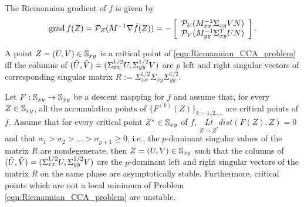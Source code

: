 \documentclass[11pt,a4paper]{article}
\begin{document}
The Riemannian gradient of $f$ is given by
\begin{equation}
\text{grad}\, f(Z) = \mathcal{P}_Z(M^{-1}\nabla \bar{f}(Z)) = -
\left[\begin{array}{c}\mathcal{P}_U(M_{xx}^{-1}\Sigma_{xy}VN)\\\mathcal{P}_V(M_{yy}^{-1}\Sigma_{xy}^TUN)\end{array}\right].
\end{equation}

\begin{proposition}
A point $Z = (U,V)\in\mathbb{S}_{xy}$ is a critical point of \eqref{eqn:Riemannian_CCA_problem} iff the columns of $(\Tilde{U},\Tilde{V}) = (\Sigma_{xx}^{1/2}U,\Sigma_{yy}^{1/2}V)$ are $p$ left and right singular vectors of corresponding singular matrix $R:= \Sigma_{xx}^{1/2}\Sigma_{xy}\Sigma_{yy}^{1/2}$.
\end{proposition}

\begin{proposition}
Let $F:\mathbb{S}_{xy}\rightarrow \mathbb{S}_{xy}$ be a descent mapping for $f$ and assume that, for every $Z\in \mathbb{S}_{xy}$, all the accumulation points of $\{F^{(k)}(Z)\}_{k=1,2,\ldots}$ are critical points of $f$. Assume that for every critical point $Z^*\in \mathbb{S}_{xy}$ of $f$, $\underset{Z\rightarrow Z^*}{Lt}dist(F(Z),Z) = 0$ and that $\sigma_1>\sigma_2>\ldots>\sigma_{p+1}\ge 0$, i.e., the $p$-dominant singular values of the matrix $R$ are nondegenerate, then $Z = (U,V)\in \mathbb{S}_{xy}$ such that the columns of $(\Tilde{U},\Tilde{V}) = (\Sigma_{xx}^{1/2}U, \Sigma_{yy}^{1/2}V)$ are the $p$-dominant left and right singular vectors of the matrix $R$ on the same phase are asymptotically stable. Furthermore, critical points which are not a local minimum of Problem \eqref{eqn:Riemannian_CCA_problem} are unstable.
\end{proposition}
\end{document}
